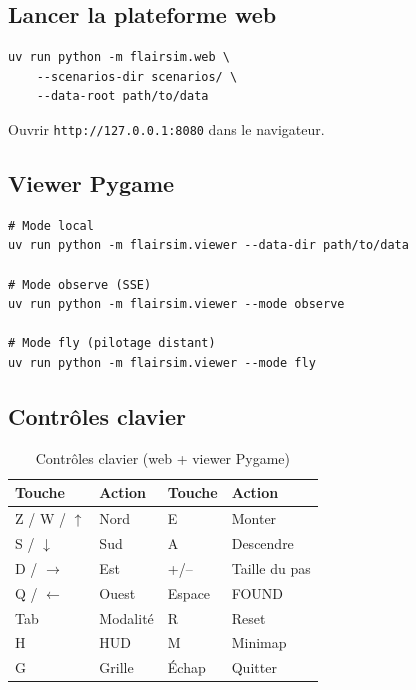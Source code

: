 \documentclass[a4paper, 11pt, french]{article}
\newcommand{\code}[1]{\texttt{#1}}
\begin{document}
\subsection{Lancer la plateforme web}

\begin{lstlisting}[style=bash]
uv run python -m flairsim.web \
    --scenarios-dir scenarios/ \
    --data-root path/to/data
\end{lstlisting}

Ouvrir \code{http://127.0.0.1:8080} dans le navigateur.

\subsection{Viewer Pygame}

\begin{lstlisting}[style=bash]
# Mode local
uv run python -m flairsim.viewer --data-dir path/to/data

# Mode observe (SSE)
uv run python -m flairsim.viewer --mode observe

# Mode fly (pilotage distant)
uv run python -m flairsim.viewer --mode fly
\end{lstlisting}

\subsection{Contrôles clavier}

\begin{table}[H]
\centering\small
\begin{tabular}{ll|ll}
\toprule
\textbf{Touche} & \textbf{Action} & \textbf{Touche} & \textbf{Action} \\
\midrule
Z / W / $\uparrow$ & Nord       & E        & Monter \\
S / $\downarrow$    & Sud        & A        & Descendre \\
D / $\rightarrow$   & Est        & +/--     & Taille du pas \\
Q / $\leftarrow$    & Ouest      & Espace   & FOUND \\
Tab                 & Modalité   & R        & Reset \\
H                   & HUD        & M        & Minimap \\
G                   & Grille     & Échap    & Quitter \\
\bottomrule
\end{tabular}
\caption{Contrôles clavier (web + viewer Pygame)}
\end{table}
\end{document}
